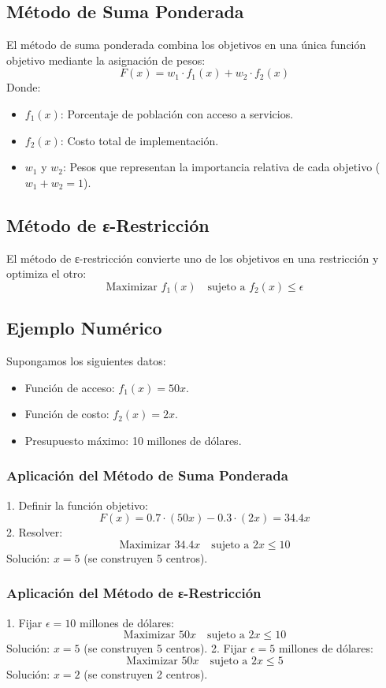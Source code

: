 \documentclass[12pt]{article}
\begin{document}
\subsection*{Método de Suma Ponderada}
El método de suma ponderada combina los objetivos en una única función objetivo mediante la asignación de pesos:
\[
F(x) = w_1 \cdot f_1(x) + w_2 \cdot f_2(x)
\]
Donde:
\begin{itemize}
    \item \( f_1(x) \): Porcentaje de población con acceso a servicios.
    \item \( f_2(x) \): Costo total de implementación.
    \item \( w_1 \) y \( w_2 \): Pesos que representan la importancia relativa de cada objetivo (\( w_1 + w_2 = 1 \)).
\end{itemize}

\subsection*{Método de ε-Restricción}
El método de ε-restricción convierte uno de los objetivos en una restricción y optimiza el otro:
\[
\text{Maximizar } f_1(x) \quad \text{sujeto a } f_2(x) \leq \epsilon
\]

\subsection*{Ejemplo Numérico}
Supongamos los siguientes datos:
\begin{itemize}
    \item Función de acceso: \( f_1(x) = 50x \).
    \item Función de costo: \( f_2(x) = 2x \).
    \item Presupuesto máximo: 10 millones de dólares.
\end{itemize}

\subsubsection*{Aplicación del Método de Suma Ponderada}
1. Definir la función objetivo:
   \[
   F(x) = 0.7 \cdot (50x) - 0.3 \cdot (2x) = 34.4x
   \]
2. Resolver:
   \[
   \text{Maximizar } 34.4x \quad \text{sujeto a } 2x \leq 10
   \]
   Solución: \( x = 5 \) (se construyen 5 centros).

\subsubsection*{Aplicación del Método de ε-Restricción}
1. Fijar \( \epsilon = 10 \) millones de dólares:
   \[
   \text{Maximizar } 50x \quad \text{sujeto a } 2x \leq 10
   \]
   Solución: \( x = 5 \) (se construyen 5 centros).
2. Fijar \( \epsilon = 5 \) millones de dólares:
   \[
   \text{Maximizar } 50x \quad \text{sujeto a } 2x \leq 5
   \]
   Solución: \( x = 2 \) (se construyen 2 centros).
\end{document}
